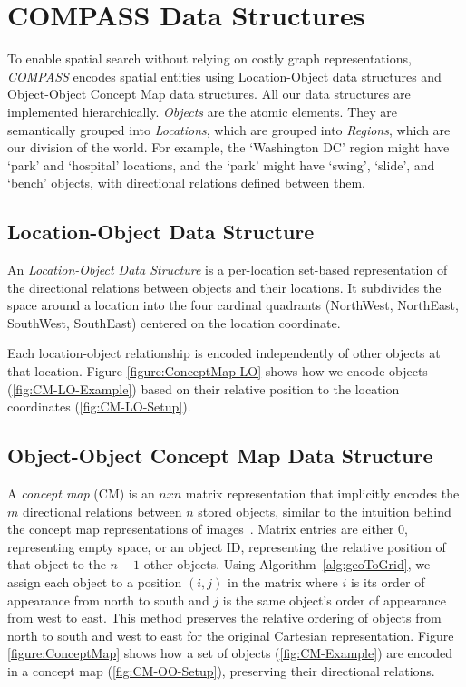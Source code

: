 \section{COMPASS Data Structures}
\label{section:data_structures}
To enable spatial search without relying on costly graph representations, \emph{COMPASS} encodes spatial entities using Location-Object data structures and Object-Object Concept Map data structures. 
All our data structures are implemented hierarchically. \textit{Objects} are the atomic elements. They are semantically grouped into \textit{Locations}, which are grouped into \textit{Regions}, which are our division of the world. For example, the `Washington DC' region might have `park' and `hospital' locations, and the `park' might have `swing', `slide', and `bench' objects, with directional relations defined between them. 

\subsection{Location-Object Data Structure}
An \textit{Location-Object Data Structure} is a per-location set-based representation of the directional relations between objects and their locations.
It subdivides the space around a location into the four cardinal quadrants (NorthWest, NorthEast, SouthWest, SouthEast) centered on the location coordinate.

Each location-object relationship is encoded independently of other objects at that location.
Figure \ref{figure:ConceptMap-LO} shows how we encode objects (\ref{fig:CM-LO-Example}) based on their relative position to the location coordinates (\ref{fig:CM-LO-Setup}).


\subsection{Object-Object Concept Map Data Structure}

A \textit{concept map} (CM) is an $nxn$ matrix representation that implicitly encodes the $m$ directional relations between $n$ stored objects, similar to the intuition behind the concept map representations of images~\cite{Xu2010}.
Matrix entries are either $0$, representing empty space, or an object ID, representing the relative position of that object to the $n-1$ other objects.
Using Algorithm~\ref{alg:geoToGrid}, we assign each object to a position $(i,j)$ in the matrix where $i$ is its order of appearance from north to south and $j$ is the same object's order of appearance from west to east.
This method preserves the relative ordering of objects from north to south and west to east for the original Cartesian representation.
Figure \ref{figure:ConceptMap} shows how a set of objects (\ref{fig:CM-Example}) are encoded in a concept map (\ref{fig:CM-OO-Setup}), preserving their directional relations. 


